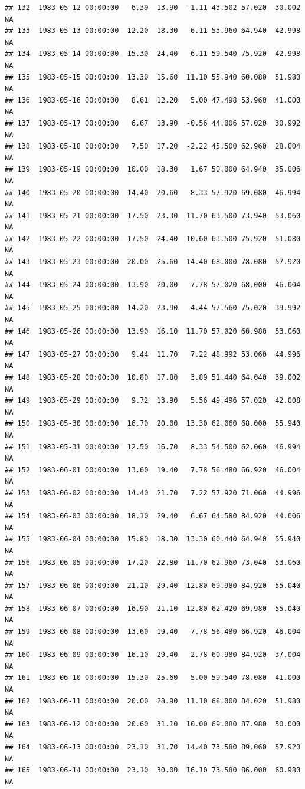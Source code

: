 \documentclass{article}\usepackage{graphicx, color}
\makeatletter
\newenvironment{kframe}{%
 \def\at@end@of@kframe{}%
 \ifinner\ifhmode%
  \def\at@end@of@kframe{\end{minipage}}%
  \begin{minipage}{\columnwidth}%
 \fi\fi%
 \def\FrameCommand##1{\hskip\@totalleftmargin \hskip-\fboxsep
 \colorbox{shadecolor}{##1}\hskip-\fboxsep
     \hskip-\linewidth \hskip-\@totalleftmargin \hskip\columnwidth}%
 \MakeFramed {\advance\hsize-\width
   \@totalleftmargin\z@ \linewidth\hsize
   \@setminipage}}%
 {\par\unskip\endMakeFramed%
 \at@end@of@kframe}
\newenvironment{knitrout}{}{} %
\makeatother
\begin{document}
\begin{knitrout}
\begin{kframe}
\begin{verbatim}
## 132  1983-05-12 00:00:00   6.39  13.90  -1.11 43.502 57.020  30.002     NA
## 133  1983-05-13 00:00:00  12.20  18.30   6.11 53.960 64.940  42.998     NA
## 134  1983-05-14 00:00:00  15.30  24.40   6.11 59.540 75.920  42.998     NA
## 135  1983-05-15 00:00:00  13.30  15.60  11.10 55.940 60.080  51.980     NA
## 136  1983-05-16 00:00:00   8.61  12.20   5.00 47.498 53.960  41.000     NA
## 137  1983-05-17 00:00:00   6.67  13.90  -0.56 44.006 57.020  30.992     NA
## 138  1983-05-18 00:00:00   7.50  17.20  -2.22 45.500 62.960  28.004     NA
## 139  1983-05-19 00:00:00  10.00  18.30   1.67 50.000 64.940  35.006     NA
## 140  1983-05-20 00:00:00  14.40  20.60   8.33 57.920 69.080  46.994     NA
## 141  1983-05-21 00:00:00  17.50  23.30  11.70 63.500 73.940  53.060     NA
## 142  1983-05-22 00:00:00  17.50  24.40  10.60 63.500 75.920  51.080     NA
## 143  1983-05-23 00:00:00  20.00  25.60  14.40 68.000 78.080  57.920     NA
## 144  1983-05-24 00:00:00  13.90  20.00   7.78 57.020 68.000  46.004     NA
## 145  1983-05-25 00:00:00  14.20  23.90   4.44 57.560 75.020  39.992     NA
## 146  1983-05-26 00:00:00  13.90  16.10  11.70 57.020 60.980  53.060     NA
## 147  1983-05-27 00:00:00   9.44  11.70   7.22 48.992 53.060  44.996     NA
## 148  1983-05-28 00:00:00  10.80  17.80   3.89 51.440 64.040  39.002     NA
## 149  1983-05-29 00:00:00   9.72  13.90   5.56 49.496 57.020  42.008     NA
## 150  1983-05-30 00:00:00  16.70  20.00  13.30 62.060 68.000  55.940     NA
## 151  1983-05-31 00:00:00  12.50  16.70   8.33 54.500 62.060  46.994     NA
## 152  1983-06-01 00:00:00  13.60  19.40   7.78 56.480 66.920  46.004     NA
## 153  1983-06-02 00:00:00  14.40  21.70   7.22 57.920 71.060  44.996     NA
## 154  1983-06-03 00:00:00  18.10  29.40   6.67 64.580 84.920  44.006     NA
## 155  1983-06-04 00:00:00  15.80  18.30  13.30 60.440 64.940  55.940     NA
## 156  1983-06-05 00:00:00  17.20  22.80  11.70 62.960 73.040  53.060     NA
## 157  1983-06-06 00:00:00  21.10  29.40  12.80 69.980 84.920  55.040     NA
## 158  1983-06-07 00:00:00  16.90  21.10  12.80 62.420 69.980  55.040     NA
## 159  1983-06-08 00:00:00  13.60  19.40   7.78 56.480 66.920  46.004     NA
## 160  1983-06-09 00:00:00  16.10  29.40   2.78 60.980 84.920  37.004     NA
## 161  1983-06-10 00:00:00  15.30  25.60   5.00 59.540 78.080  41.000     NA
## 162  1983-06-11 00:00:00  20.00  28.90  11.10 68.000 84.020  51.980     NA
## 163  1983-06-12 00:00:00  20.60  31.10  10.00 69.080 87.980  50.000     NA
## 164  1983-06-13 00:00:00  23.10  31.70  14.40 73.580 89.060  57.920     NA
## 165  1983-06-14 00:00:00  23.10  30.00  16.10 73.580 86.000  60.980     NA

\end{verbatim}
\end{kframe}
\end{knitrout}
\end{document}
